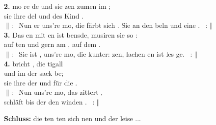 \textbf{2.} mo  re de und sie zen zumen im ; \\
sie  ihre del und des Kind . \\
$\|$:~ Nun er uns're mo, die  färbt sich . 
Sie  an den beln und  eine . ~:$\|$ \\[0.5em]
\noindent\textbf{3.} Das en mit en ist bensde, musiren  sie so : \\
auf ten und gern am , auf dem . \\
$\|$:~ Sie ist , uns're mo, die  kunter: 
zen, lachen en ist les ge. ~:$\|$ \\[0.5em]
\noindent\textbf{4.}  bricht , die tigall  \\und im  der sack be; \\
sie  ihre der und  für die . \\
$\|$:~ Nun  uns're mo, das  zittert , \\
 schläft bis der  den winden . ~:$\|$

\noindent\textbf{Schluss:}  die ten ten sich nen und der  leise ...
